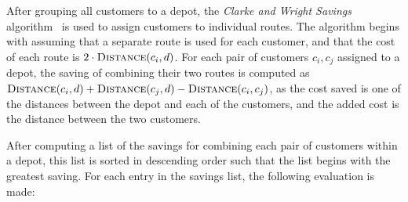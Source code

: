 \documentclass[paper=a4, fontsize=10pt]{scrartcl}
\begin{document}
\begin{multicols}{2}
\vspace{0.2cm}

After grouping all customers to a depot, the \textit{Clarke and Wright Savings} algorithm~\cite{clarke1964scheduling} is used to assign customers to individual routes. The algorithm begins with assuming that a separate route is used for each customer, and that the cost of each route is $2 \cdot \textsc{Distance}(c_i, d)$. For each pair of customers $c_i, c_j$ assigned to a depot, the saving of combining their two routes is computed as $\textsc{Distance}(c_i, d) + \textsc{Distance}(c_j, d) - \textsc{Distance}(c_i, c_j)$, as the cost saved is one of the distances between the depot and each of the customers, and the added cost is the distance between the two customers.

After computing a list of the savings for combining each pair of customers within a depot, this list is sorted in descending order such that the list begins with the greatest saving. For each entry in the savings list, the following evaluation is made:


\end{multicols}
\end{document}
